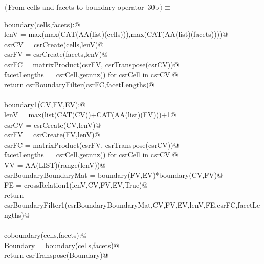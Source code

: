 \documentclass[11pt,oneside]{article}    %
\begin{document}
\begin{flushleft} \small \label{scrap49}
\protect{}$\langle\,$From cells and facets to boundary operator\nobreak\ {\footnotesize 30b}$\,\rangle\equiv$
\vspace{-1ex}
\begin{list}{}{} \item
\mbox{}\verb@def boundary(cells,facets):@\\
\mbox{}\verb@    lenV = max(max(CAT(AA(list)(cells))),max(CAT(AA(list)(facets))))@\\
\mbox{}\verb@    csrCV = csrCreate(cells,lenV)@\\
\mbox{}\verb@    csrFV = csrCreate(facets,lenV)@\\
\mbox{}\verb@    csrFC = matrixProduct(csrFV, csrTranspose(csrCV))@\\
\mbox{}\verb@    facetLengths = [csrCell.getnnz() for csrCell in csrCV]@\\
\mbox{}\verb@    return csrBoundaryFilter(csrFC,facetLengths)@\\
\mbox{}\verb@@\\
\mbox{}\verb@def boundary1(CV,FV,EV):@\\
\mbox{}\verb@    lenV = max(list(CAT(CV))+CAT(AA(list)(FV)))+1@\\
\mbox{}\verb@    csrCV = csrCreate(CV,lenV)@\\
\mbox{}\verb@    csrFV = csrCreate(FV,lenV)@\\
\mbox{}\verb@    csrFC = matrixProduct(csrFV, csrTranspose(csrCV))@\\
\mbox{}\verb@    facetLengths = [csrCell.getnnz() for csrCell in csrCV]@\\
\mbox{}\verb@    VV = AA(LIST)(range(lenV))@\\
\mbox{}\verb@    csrBoundaryBoundaryMat = boundary(FV,EV)*boundary(CV,FV)@\\
\mbox{}\verb@    FE = crossRelation1(lenV,CV,FV,EV,True)@\\
\mbox{}\verb@    return csrBoundaryFilter1(csrBoundaryBoundaryMat,CV,FV,EV,lenV,FE,csrFC,facetLengths)@\\
\mbox{}\verb@@\\
\mbox{}\verb@def coboundary(cells,facets):@\\
\mbox{}\verb@    Boundary = boundary(cells,facets)@\\
\mbox{}\verb@    return csrTranspose(Boundary)@\\

\end{list}
\end{flushleft}
\end{document}
